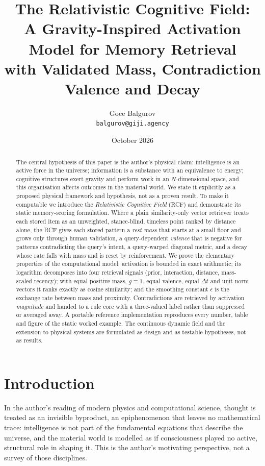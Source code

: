 \documentclass[11pt]{article}
\title{The Relativistic Cognitive Field:\\
A Gravity-Inspired Activation Model for Memory Retrieval\\
with Validated Mass, Contradiction Valence and Decay}
\author{Goce Balgurov\\
\texttt{balgurov@giji.agency}}
\date{October 2026}
\theoremstyle{remark}
\begin{document}
\maketitle

\begin{abstract}
The central hypothesis of this paper is the author's physical claim: intelligence is an active force in the universe; information is a substance with an equivalence to energy; cognitive structures exert gravity and perform work in an $N$-dimensional space, and this organisation affects outcomes in the material world. We state it explicitly as a proposed physical framework and hypothesis, not as a proven result. To make it computable we introduce the \emph{Relativistic Cognitive Field} (RCF) and demonstrate its static memory-scoring formulation. Where a plain similarity-only vector retriever treats each stored item as an unweighted, stance-blind, timeless point ranked by distance alone, the RCF gives each stored pattern a \emph{rest mass} that starts at a small floor and grows only through human validation, a query-dependent \emph{valence} that is negative for patterns contradicting the query's intent, a query-warped diagonal metric, and a decay whose rate falls with mass and is reset by reinforcement. We prove the elementary properties of the computational model: activation is bounded in exact arithmetic; its logarithm decomposes into four retrieval signals (prior, interaction, distance, mass-scaled recency); with equal positive mass, $g\equiv 1$, equal valence, equal $\Delta t$ and unit-norm vectors it ranks exactly as cosine similarity; and the smoothing constant $\epsilon$ is the exchange rate between mass and proximity. Contradictions are retrieved by activation \emph{magnitude} and handed to a rule core with a three-valued label rather than suppressed or averaged away. A portable reference implementation reproduces every number, table and figure of the static worked example. The continuous dynamic field and the extension to physical systems are formulated as design and as testable hypotheses, not as results.
\end{abstract}

\section{Introduction}

In the author's reading of modern physics and computational science, thought is treated as an invisible byproduct, an epiphenomenon that leaves no mathematical trace: intelligence is not part of the fundamental equations that describe the universe, and the material world is modelled as if consciousness played no active, structural role in shaping it. This is the author's motivating perspective, not a survey of those disciplines.
\end{document}

